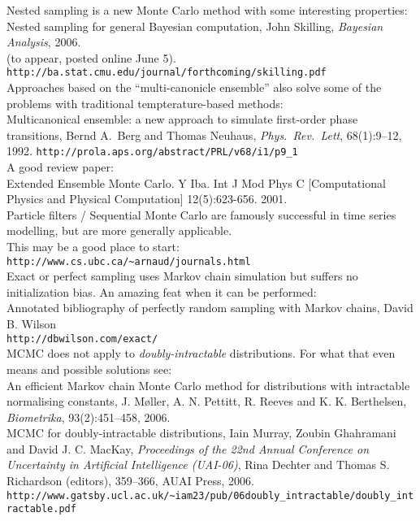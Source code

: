 \documentclass[25pt,landscape]{foils}
\begin{document}
{\tiny

Nested sampling is a new Monte Carlo method with some interesting properties:\\
Nested sampling for general Bayesian computation, John Skilling, \textsl{Bayesian Analysis}, 2006.\\
(to appear, posted online June 5). \texttt{http://ba.stat.cmu.edu/journal/forthcoming/skilling.pdf}\\[-0.05in]

Approaches based on the ``multi-canonicle ensemble'' also solve some of the
problems with traditional tempterature-based methods:\\
Multicanonical ensemble: a new approach to simulate first-order phase transitions, Bernd A.\ Berg and Thomas Neuhaus, \textsl{Phys.\ Rev.\ Lett}, 68(1):9--12, 1992.
\texttt{http://prola.aps.org/abstract/PRL/v68/i1/p9\_1}\\[-0.05in]

A good review paper:\\
Extended Ensemble Monte Carlo. Y Iba. Int J Mod Phys C [Computational Physics and Physical Computation] 12(5):623-656. 2001.\\[-0.05in]

Particle filters / Sequential Monte Carlo are famously successful in time series
modelling, but are more generally applicable.\\This may be a good place to start:
\texttt{http://www.cs.ubc.ca/\~{}arnaud/journals.html}\\[-0.05in]

Exact or perfect sampling uses Markov chain simulation but suffers no
initialization bias. An amazing feat when it can be performed:\\
Annotated bibliography of perfectly random sampling with Markov chains, David B. Wilson\\
\texttt{http://dbwilson.com/exact/}\\[-0.05in]

MCMC does not apply to \emph{doubly-intractable} distributions. For what that even
means and possible solutions see:\\
An efficient Markov chain Monte Carlo method for distributions with intractable normalising constants, J. M{\o}ller, A. N. Pettitt, R. Reeves and K. K. Berthelsen, \textsl{Biometrika}, 93(2):451--458, 2006.\\
MCMC for doubly-intractable distributions, Iain Murray, Zoubin Ghahramani and David J. C. MacKay, \textsl{Proceedings of the 22nd Annual Conference on Uncertainty in Artificial Intelligence (UAI-06)}, Rina Dechter and Thomas S. Richardson (editors), 359--366, AUAI Press, 2006.
\texttt{http://www.gatsby.ucl.ac.uk/\~{}iam23/pub/06doubly\_intractable/doubly\_intractable.pdf}\\

}
\end{document}
